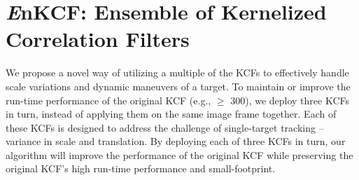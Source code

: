\documentclass[10pt,twocolumn,letterpaper]{article}
\begin{document}
\section{{\it E}nKCF: Ensemble of Kernelized Correlation Filters}
We propose a novel way of utilizing a multiple of the KCFs
\cite{henriques2015high} to effectively handle scale variations and
dynamic maneuvers of a target. To maintain or improve the run-time
performance of the original KCF (e.g., $\ge$ 300), we deploy three
KCFs in turn, instead of applying them on the same image frame
together. Each of these KCFs is designed to address the challenge of
single-target tracking -- variance in scale and translation. By
deploying each of three KCFs in turn, our algorithm will improve the
performance of the original KCF while preserving the original KCF's
high run-time performance and small-footprint.
\end{document}
